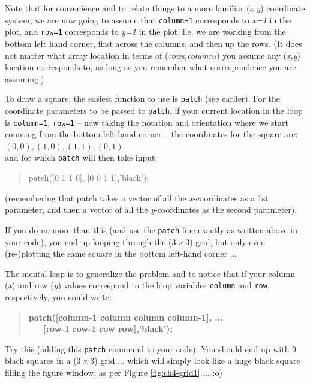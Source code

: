 \documentclass{tufte-book} %
\newenvironment{docspec}{\begin{quotation}\ttfamily\parskip0pt\parindent0pt\ignorespaces}{\end{quotation}}
\newenvironment{docspecbold}{\begin{quotation}\ttfamily\bfseries\parskip0pt\parindent0pt\ignorespaces}{\end{quotation}}
\begin{document}
Note that for convenience and to relate things to a more familiar (\textit{x,y}) coordinate system, we are now going to assume that \texttt{column=1} corresponds to \textit{x=1} in the plot, and \texttt{row=1} corresponds to \textit{y=1} in the plot. i.e. we are working from the bottom left hand corner, first across the columns, and then up the rows. (It does not matter what array location in terms of (\textit{rows,columns}) you assume any (\textit{x,y}) location corresponds to, as long as you remember what correspondence you are assuming.)

To draw a square, the easiest function to use is \texttt{patch} (see earlier). For the coordinate parameters to be passed to \texttt{patch}, if your current location in the loop is \texttt{column=1}, \texttt{row=1} -- now taking the notation and orientation where we start counting from the \uline{bottom left-hand corner} --  the coordinates for the square are:
\vspace{1mm}
\\\((0,0), (1,0), (1,1), (0,1)\)
\vspace{1mm}
\\\noindent and for which \texttt{patch} will then take input:

\begin{docspec}
patch([0 1 1 0], [0 0 1 1],'black');
\end{docspec}

\noindent (remembering that patch takes a vector of all the \textit{x}-coordinates as a 1st parameter, and then a vector of all the \textit{y}-coordinates as the second parameter).

If you do no more than this (and use the \texttt{patch} line exactly as written above in your code), you end up looping through the (\(3\times3\)) grid, but only even (re-)plotting the same square in the bottom left-hand corner ...

The mental leap is to \uline{generalize} the problem and  to notice that if your column (\textit{x}) and row (\textit{y}) values correspond to the loop variables \texttt{column} and \texttt{row}, respectively, you could write:

\begin{docspecbold}
patch([column-1 column column column-1], ...\\
\ \ \ [row-1 row-1 row row],'black');
\end{docspecbold}

Try this (adding this \texttt{patch} command to your code). You should end up with 9 black squares in a (\(3\times3\)) grid ... which will simply look like a huge black square filling the figure window, as per Figure \ref{fig:ch4-grid1} ... :o)
\end{document}
